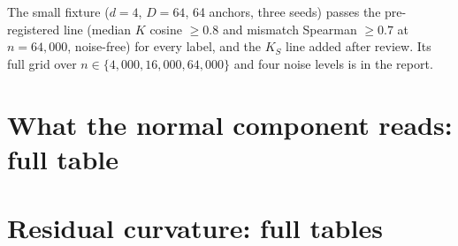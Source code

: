 \documentclass[10pt]{article}
\newcommand{\norm}[1]{\lVert #1 \rVert}
\newcommand{\tmodel}{t^*_{\mathrm{model}}}
\begin{document}
The small fixture ($d=4$, $D=64$, 64 anchors, three seeds) passes the pre-registered line (median $K$ cosine $\ge0.8$ and mismatch Spearman $\ge0.7$ at $n=64{,}000$, noise-free) for every label, and the $K_S$ line added after review. Its full grid over $n\in\{4{,}000,16{,}000,64{,}000\}$ and four noise levels is in the report.

\clearpage
\section{What the normal component reads: full table}
\label{app:normal}

\begin{table}[h]
\centering\scriptsize\setlength{\tabcolsep}{3pt}

\caption{Per run and label, $\alpha=100$, 512 anchors. $\norm{q}/\norm{p}$: median over anchors of the ratio of centred amplitudes; $\norm{q}^2/\norm{p}^2$: its square (median). Help: fraction of anchors where $t=1$ beats $t=0$. $\Delta R^2(1)$: median. $t^*_S$: median, with the fraction of anchors where $t^*_S>1$. Random: help of the random in-sphere direction with matched centred amplitude.}
\label{tab:normal_full}
\end{table}

\begin{table}[h]
\centering\footnotesize

\caption{Ten galaxy encoders ($d=16$, $\alpha=100$): ranges over the four labels of the median amplitude ratio, the median data-side $t^*_S$, and the help fraction of the data-side variant.}
\label{tab:normal_ten}
\end{table}

\begin{table}[h]
\centering\scriptsize

\caption{Decoder-variant counterfactual on ten galaxy encoders at $d=16$, $\alpha=100$ (from the scaling report). Help: $t=1$ beats shape-flat; hurt: $t=-1$ worse than shape-flat; median $\Delta R^2$ at $t=\pm1$ and median $\tmodel$; the same for a random in-sphere direction rescaled to the same centred amplitude; one-sided sign-test bound for help on a maximal set of anchors with pairwise overlap at most 5\% of $k$. By Lemma~\ref{lem:identity} help and hurt are functions of $\tmodel$.}
\label{tab:cf}
\end{table}

\clearpage
\section{Residual curvature: full tables}
\label{app:diag}
\end{document}
